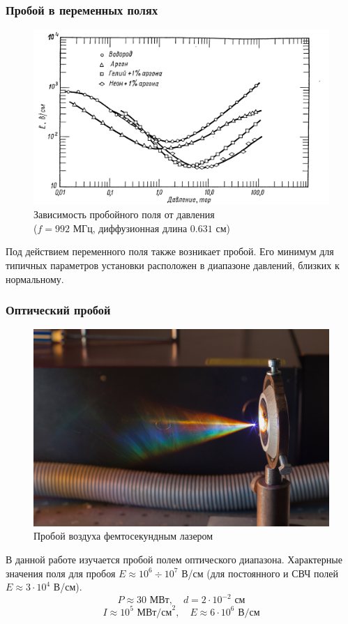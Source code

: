 \documentclass{beamer}
\begin{document}
	\begin{frame}
		\frametitle{Пробой в переменных полях}
		
		\begin{figure}
			\centering
			\captionsetup{justification=centering}
			\includegraphics[width=0.8\linewidth]{res/microwave_discharge.png}
			\caption*{Зависимость пробойного поля от давления\\ ($f = 992$ МГц, диффузионная длина $0.631$ см)}
		\end{figure}
		
		Под действием переменного поля также возникает пробой. Его минимум для типичных параметров установки расположен в диапазоне давлений, близких к нормальному.
	\end{frame}

	\begin{frame}
		\frametitle{Оптический пробой}
		\begin{figure}
			\centering
			\captionsetup{justification=centering}
			\includegraphics[width=0.6\linewidth]{res/femtosecond_laser_spark.jpg}
			\caption*{Пробой воздуха фемтосекундным лазером}
		\end{figure}
		В данной работе изучается пробой полем оптического диапазона. Характерные значения поля для пробоя $E \approx 10^6 \div 10^7$ В/см (для постоянного и СВЧ полей $E \approx 3 \cdot 10^4$ В/см). 
		$$ P \approx 30 \text{ МВт}, \quad d = 2 \cdot 10^{-2} \text{ см} $$
		$$ I \approx 10^5 \text{ МВт/см}^2, \quad E \approx 6 \cdot 10^6 \text{ В/см} $$

	
	\end{frame}
\end{document}
